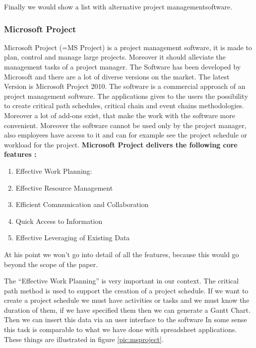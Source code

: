 Finally we would show a list with alternative project managementsoftware.

\subsubsection{Microsoft Project}
Microsoft Project \cite{msp} (=MS Project) is a project management software, it is made to plan, control and manage large projects. Moreover it should alleviate the management tasks of a project manager. 
The Software has been developed by Microsoft and there are a lot of diverse versions on the market. The latest Version is Microsoft Project 2010. The software is a commercial approach of an project management software.
The applications gives to the users the possibility to create critical path schedules, critical chain and event chains methodologies. Moreover a lot of add-ons exist, that make the work with the software more convenient. Moreover the software cannot be used only by the project manager, also employees have access to it and can for example see the project schedule or workload for the project.
\newline
\newline
\noindent
\textbf{Microsoft Project delivers the following core features \cite{fmp}:}
\begin{enumerate}
\item Effective Work Planning:
\item Effective Resource Management
\item Efficient Communication and Collaboration
\item Quick Access to Information
\item Effective Leveraging of Existing Data
\end{enumerate}

At his point we won't go into detail of all the features, because this would go beyond the scope of the paper.

The “Effective Work Planning” is very important in our context. The critical path method is used to support the creation of a project schedule. 
If we want to create a project schedule we must have activities or tasks and we must know the duration of them, if we have specified them then we can generate a Gantt Chart. Then we can insert this data via an user interface to the software In some sense this task is comparable to what we have done with spreadsheet applications. These things are illustrated in figure \ref{pic:msproject}.

